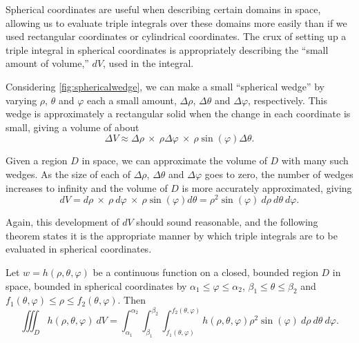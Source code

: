 Spherical coordinates are useful when describing certain domains in space, allowing us to evaluate triple integrals over these domains more easily than if we used rectangular coordinates or cylindrical coordinates. The crux of setting up a triple integral in spherical coordinates is appropriately describing the ``small amount of volume,'' $dV$, used in the integral.

Considering \autoref{fig:sphericalwedge}, we can make a small ``spherical wedge'' by varying $\rho$, $\theta$ and $\varphi$ each a small amount, $\Delta\rho$, $\Delta\theta$ and $\Delta\varphi$, respectively. This wedge is approximately a rectangular solid when the change in each coordinate is small, giving a volume of about
\[
\Delta V \approx \Delta\rho\ \times\ \rho\Delta\varphi\ \times\ \rho\sin(\varphi)\Delta\theta.
\]
%

Given a region $D$ in space, we can approximate the volume of $D$ with many such wedges. As the size of each of $\Delta\rho$, $\Delta\theta$ and $\Delta\varphi$ goes to zero, the number of wedges increases to infinity and the volume of $D$ is more accurately approximated, giving
\[
dV = d\rho\ \times\ \rho\ d\varphi\ \times\ \rho\sin(\varphi)d\theta = \rho^2\sin(\varphi)\ d\rho\ d\theta\ d\varphi.
\]

Again, this development of $dV$ should sound reasonable, and the following theorem states it is the appropriate manner by which triple integrals are to be evaluated in spherical coordinates.
%

{Let $w=h(\rho,\theta,\varphi)$ be a continuous function on a closed, bounded region $D$ in space, bounded in spherical coordinates by $\alpha_1 \leq \varphi \leq \alpha_2$, $\beta_1 \leq \theta \leq \beta_2$ and $f_1(\theta,\varphi) \leq \rho \leq f_2(\theta,\varphi)$. Then 
\[
\iiint_D h(\rho,\theta,\varphi)\ dV = \int_{\alpha_1}^{\alpha_2}\int_{\beta_1}^{\beta_2}\int_{f_1(\theta,\varphi)}^{f_2(\theta,\varphi)} h(\rho,\theta,\varphi) \rho^2\sin(\varphi)\ d\rho\ d\theta\ d\varphi.
\]}

